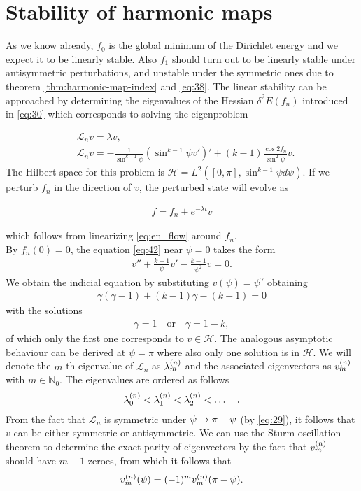 \section{Stability of harmonic maps}
\label{sec:stab-ground-stat}

As we know already, $f_0$ is the global minimum of the Dirichlet
energy and we expect it to be linearly stable. Also $f_1$ should turn
out to be linearly stable under antisymmetric perturbations, and
unstable under the symmetric ones due to theorem
\ref{thm:harmonic-map-index} and \eqref{eq:38}. The linear stability
can be approached by determining the eigenvalues of the Hessian
$\delta^2E(f_n)$ introduced in \eqref{eq:30} which corresponds to
solving the eigenproblem

\begin{align}
  \label{eq:42}
  &\mathcal{L}_n v = \lambda v, \\
  \label{eq:43}
  &\mathcal{L}_n v = -\frac{1}{\sin^{k-1}\psi}\left(\sin^{k-1}\psi
    v'\right)'+(k-1)\frac{\cos2f_n}{\sin^2\psi}v.
\end{align}
The Hilbert space for this problem is
$\mathcal{H}=L^2([0,\pi],\sin^{k-1}\psi d\psi)$. If we perturb $f_n$
in the direction of $v$, the perturbed state will evolve as

\begin{align}
  \label{eq:44}
  f=f_n+e^{-\lambda t}v
\end{align}

which follows from linearizing \eqref{eq:en_flow} around $f_n$.\\

By $f_n(0)=0$, the equation \eqref{eq:42} near $\psi=0$ takes the form
\begin{align}
  \label{eq:45}
  v''+\frac{k-1}{\psi}v'-\frac{k-1}{\psi^2}v=0.
\end{align}
We obtain the indicial equation by substituting $v(\psi)=\psi^\gamma$
obtaining
\begin{align}
  \label{eq:46}
  \gamma(\gamma-1)+(k-1)\gamma-(k-1)=0
\end{align}
with the solutions
\begin{align}
  \label{eq:47}
  \gamma=1\quad\text{or}\quad\gamma=1-k,
\end{align}
of which only the first one corresponds to $v\in\mathcal{H}$. The
analogous asymptotic behaviour can be derived at $\psi=\pi$ where also
only one solution is in $\mathcal{H}$. We will denote the $m$-th
eigenvalue of $\mathcal{L}_n$ as $\lb{n}{m}$ and the associated
eigenvectors as $\vn{m}{n}$ with $m\in\mathbb{N}_0$. The eigenvalues
are ordered as follows
\begin{align}
  \label{eq:48}
  \lb{n}{0}<\lb{n}{1}<\lb{n}{2}<\dots\quad.
\end{align}
From the fact that $\mathcal{L}_n$ is symmetric under
$\psi\ra\pi-\psi$ (by \eqref{eq:29}), it follows that $v$ can be
either symmetric or antisymmetric. We can use the Sturm oscillation
theorem \cite{Reed4} to determine the exact parity of eigenvectors by
the fact that $\vn{m}{n}$ should have $m-1$ zeroes, from which it
follows that
\begin{align}
  \label{eq:49}
  \vn{m}{n}(\psi)=(-1)^m \vn{m}{n}(\pi-\psi).
\end{align}

